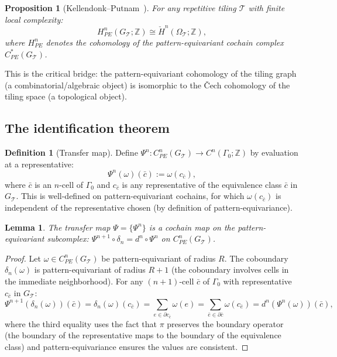 \documentclass[12pt]{article}
\newtheorem{proposition}[theorem]{Proposition}
\newtheorem{lemma}[theorem]{Lemma}
\theoremstyle{definition}
\newtheorem{definition}[theorem]{Definition}
\theoremstyle{remark}
\newcommand{\ZZ}{\mathbb{Z}}
\newcommand{\Hcech}{\check{H}}
\begin{document}
\begin{proposition}[Kellendonk--Putnam~\cite{KellendonkPutnam2006}]
\label{prop:PE-iso}
For any repetitive tiling $\mathcal{T}$ with finite local complexity:
\begin{equation}
H^n_{PE}(G_{\mathcal{T}}; \ZZ) \cong \Hcech^n(\Omega_{\mathcal{T}}; \ZZ),
\label{eq:PE-cech}
\end{equation}
where $H^n_{PE}$ denotes the cohomology of the pattern-equivariant cochain complex $C^*_{PE}(G_{\mathcal{T}})$.
\end{proposition}

This is the critical bridge: the pattern-equivariant cohomology of the tiling graph (a combinatorial/algebraic object) is isomorphic to the \v{C}ech cohomology of the tiling space (a topological object).

\subsection{The identification theorem}

\begin{definition}[Transfer map]
\label{def:transfer}
Define $\Psi^n: C^n_{PE}(G_{\mathcal{T}}) \to C^n(\Gamma_0; \ZZ)$ by evaluation at a representative:
\begin{equation}
\Psi^n(\omega)(\bar{c}) := \omega(c_{\bar{c}}),
\label{eq:transfer}
\end{equation}
where $\bar{c}$ is an $n$-cell of $\Gamma_0$ and $c_{\bar{c}}$ is any representative of the equivalence class $\bar{c}$ in $G_{\mathcal{T}}$. This is well-defined on pattern-equivariant cochains, for which $\omega(c_{\bar{c}})$ is independent of the representative chosen (by definition of pattern-equivariance).
\end{definition}

\begin{lemma}
\label{lem:transfer-cochain}
The transfer map $\Psi = \{\Psi^n\}$ is a cochain map on the pattern-equivariant subcomplex: $\Psi^{n+1} \circ \delta_n = d^n \circ \Psi^n$ on $C^n_{PE}(G_{\mathcal{T}})$.
\end{lemma}

\begin{proof}
Let $\omega \in C^n_{PE}(G_{\mathcal{T}})$ be pattern-equivariant of radius $R$. The coboundary $\delta_n(\omega)$ is pattern-equivariant of radius $R + 1$ (the coboundary involves cells in the immediate neighborhood). For any $(n+1)$-cell $\bar{c}$ of $\Gamma_0$ with representative $c_{\bar{c}}$ in $G_{\mathcal{T}}$:
\[
\Psi^{n+1}(\delta_n(\omega))(\bar{c}) = \delta_n(\omega)(c_{\bar{c}}) = \sum_{e \in \partial c_{\bar{c}}} \omega(e) = \sum_{\bar{e} \in \partial \bar{c}} \omega(c_{\bar{e}}) = d^n(\Psi^n(\omega))(\bar{c}),
\]
where the third equality uses the fact that $\pi$ preserves the boundary operator (the boundary of the representative maps to the boundary of the equivalence class) and pattern-equivariance ensures the values are consistent.
\end{proof}
\end{document}
